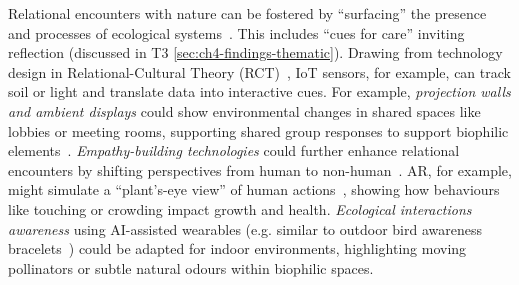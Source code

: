 Relational encounters with nature can be fostered by ``surfacing'' the presence and processes of ecological systems~\cite{flanagan2018rewilding, li2022re, steer2015growth}. This includes ``cues for care'' inviting reflection (discussed in T3 \autoref{sec:ch4-findings-thematic}).  Drawing from technology design in Relational-Cultural Theory (RCT)~\cite{comstock2008relational, kleespies2021connection, wiley2012empathy}, IoT sensors, for example, can track soil or light and translate data into interactive cues. For example, \emph{projection walls and ambient displays} could show environmental changes in shared spaces like lobbies or meeting rooms, supporting shared group responses to support biophilic elements~\cite{margariti2024evaluating}. \emph{Empathy-building technologies} could further enhance relational encounters by shifting perspectives from human to non-human~\cite{flanagan2018rewilding}. AR, for example, might simulate a ``plant’s-eye view'' of human actions~\cite{tracey2016does}, showing how behaviours like touching or crowding impact growth and health. \emph{Ecological interactions awareness} using AI-assisted wearables (e.g. similar to outdoor bird awareness bracelets~\cite{li2022re}) could be adapted for indoor environments, highlighting moving pollinators or subtle natural odours within biophilic spaces. 
